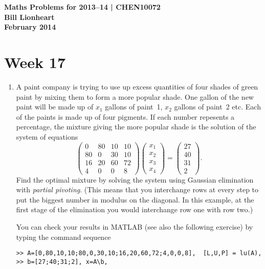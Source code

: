 \documentclass[11pt,a4paper]{article}
\begin{document}
\begin{center} 
{\bf Maths Problems for 2013--14 | CHEN10072 \\
Bill Lionheart\\
 February 2014}
\end{center}


\section*{Week 17}

\begin{enumerate}


\item\label{qdjsx3}
A paint company is trying to use up excess quantities of four shades
of green paint by mixing them to form a more popular shade. One gallon
of the new paint will be made up of $x_1$ gallons of paint~1, $x_2$
gallons of paint~2 etc. Each of the paints is made up of four
pigments. If each number repesents a percentage, 
the mixture giving the more popular shade is the solution of 
the system of equations
$$\left ( \begin{array}{rrrr}
         0 & 80 & 10 & 10 \\
        80 &  0 & 30 & 10 \\
        16 & 20 & 60 & 72 \\
         4 &  0 &  0 &  8 \end{array} \right )
   \left ( \begin{array}{c}
        x_1 \\ x_2 \\ x_3 \\ x_4 
            \end{array} \right) =
   \left ( \begin{array}{r}
        27 \\ 40 \\ 31 \\ 2 
            \end{array} \right) .$$
Find the optimal mixture by solving the system using Gaussian elimination 
with {\it partial pivoting}. (This means that you interchange rows at every step
to put the biggest number in modulus  on the diagonal. In this example,
 at the first stage of the elimination you would interchange row one with row two.)


You can check your results   in MATLAB (see also the following  exercise) by typing the command sequence
\begin{verbatim}
>> A=[0,80,10,10;80,0,30,10;16,20,60,72;4,0,0,8],  [L,U,P] = lu(A),
>> b=[27;40;31;2], x=A\b, 
\end{verbatim}



\end{enumerate}
\end{document}
